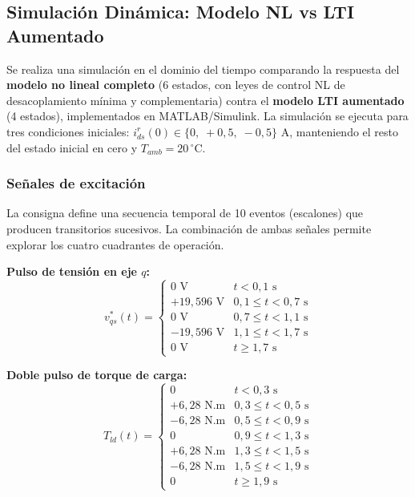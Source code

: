 \subsection{Simulación Dinámica: Modelo NL vs LTI Aumentado}
\label{sec:sim_dinamica}

Se realiza una simulación en el dominio del tiempo comparando la respuesta del \textbf{modelo no lineal completo} (6 estados, con leyes de control NL de desacoplamiento mínima y complementaria) contra el \textbf{modelo LTI aumentado} (4 estados), implementados en MATLAB/Simulink. La simulación se ejecuta para tres condiciones iniciales: $i_{ds}^r(0) \in \{0,\; +0{,}5,\; -0{,}5\}$ A, manteniendo el resto del estado inicial en cero y $T_{amb} = 20\,^\circ$C.

\subsubsection{Señales de excitación}

La consigna define una secuencia temporal de 10 eventos (escalones) que producen transitorios sucesivos. La combinación de ambas señales permite explorar los cuatro cuadrantes de operación.

\textbf{Pulso de tensión en eje $q$:}
\begin{equation}
v_{qs}^*(t) = \begin{cases}
0 \text{ V} & t < 0{,}1 \text{ s} \\
+19{,}596 \text{ V} & 0{,}1 \leq t < 0{,}7 \text{ s} \\
0 \text{ V} & 0{,}7 \leq t < 1{,}1 \text{ s} \\
-19{,}596 \text{ V} & 1{,}1 \leq t < 1{,}7 \text{ s} \\
0 \text{ V} & t \geq 1{,}7 \text{ s}
\end{cases}
\end{equation}

\textbf{Doble pulso de torque de carga:}
\begin{equation}
T_{ld}(t) = \begin{cases}
0 & t < 0{,}3 \text{ s} \\
+6{,}28 \text{ N.m} & 0{,}3 \leq t < 0{,}5 \text{ s} \\
-6{,}28 \text{ N.m} & 0{,}5 \leq t < 0{,}9 \text{ s} \\
0 & 0{,}9 \leq t < 1{,}3 \text{ s} \\
+6{,}28 \text{ N.m} & 1{,}3 \leq t < 1{,}5 \text{ s} \\
-6{,}28 \text{ N.m} & 1{,}5 \leq t < 1{,}9 \text{ s} \\
0 & t \geq 1{,}9 \text{ s}
\end{cases}
\end{equation}

